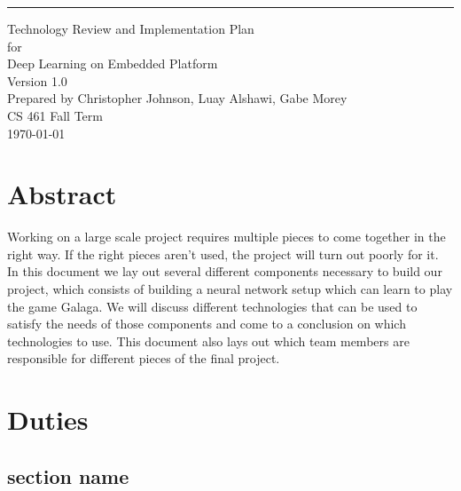 \documentclass{scrreprt}
\date{}
\def\myversion{1.0}
\begin{document}
\begin{flushright}
    \rule{16cm}{5pt}\vskip1cm
    \begin{bfseries}
        \Huge{Technology Review and Implementation Plan}\\
        \vspace{1.9cm}
        for\\
        \vspace{1.9cm}
        Deep Learning on Embedded Platform\\
        \vspace{1.9cm}
        \LARGE{Version \myversion}\\
        \vspace{1.9cm}
        Prepared by Christopher Johnson, Luay Alshawi, Gabe Morey\\
        \vspace{1.9cm}
        CS 461 Fall Term\\
        \vspace{1.9cm}
        \today\\
    \end{bfseries}
\end{flushright}


\chapter{Abstract}
Working on a large scale project requires multiple pieces to come together in the right way. If the right pieces aren’t used,
the project will turn out poorly for it. In this document we lay out several different components necessary to build our project,
which consists of building a neural network setup which can learn to play the game Galaga.
We will discuss different technologies that can be used to satisfy the needs of those components and come to a conclusion on which technologies to use.
 This document also lays out which team members are responsible for different pieces of the final project.

\chapter{Duties}
\section{section name}
\end{document}
